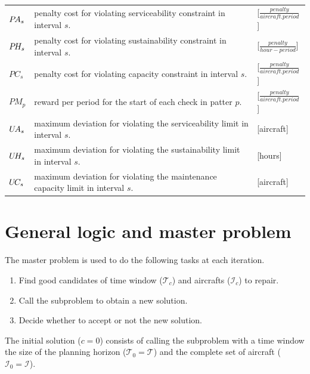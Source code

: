 \documentclass[a4paper,11pt]{article}
\begin{document}
       \begin{tabular}{p{15mm}p{105mm}p{15mm}}
            $P\hspace{-0.5mm}A_s$   & penalty cost for violating serviceability constraint in interval $s$. & [$\frac{penalty}{aircraft.period}$] \\
            $P\hspace{-0.5mm}H_s$   & penalty cost for violating sustainability constraint in interval $s$. & [$\frac{penalty}{hour-period}$] \\
            $PC_s$   & penalty cost for violating capacity constraint in interval $s$. & [$\frac{penalty}{aircraft.period}$]\\
            $PM_p$    & reward per period for the start of each check in patter $p$. & [$\frac{penalty}{aircraft.period}$]\\
            $U\hspace{-0.5mm}A_s$   & maximum deviation for violating the serviceability limit in interval $s$. & [aircraft] \\
            $U\hspace{-0.5mm}H_s$   & maximum deviation for violating the sustainability limit in interval $s$. & [hours] \\
            $U\hspace{-0.5mm}C_s$   & maximum deviation for violating the maintenance capacity limit in interval $s$. & [aircraft] \\
        \end{tabular}

\section{General logic and master problem}


  The master problem is used to do the following tasks at each iteration.

  \begin{enumerate}
    \item Find good candidates of time window ($\mathcal{T}_{c}$) and aircrafts ($\mathcal{I}_{c}$) to repair.
    \item Call the subproblem to obtain a new solution.
    \item Decide whether to accept or not the new solution.
  \end{enumerate}

  The initial solution ($c=0$) consists of calling the subproblem with a time window the size of the planning horizon ($\mathcal{T}_{0} = \mathcal{T}$) and the complete set of aircraft ($\mathcal{I}_{0} = \mathcal{I}$).
\end{document}
